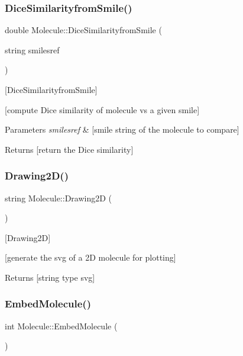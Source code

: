 \subsubsection{\texorpdfstring{Dice\+Similarityfrom\+Smile()}{DiceSimilarityfromSmile()}}
{\footnotesize\ttfamily double Molecule\+::\+Dice\+Similarityfrom\+Smile (\begin{DoxyParamCaption}\item[{string}]{smilesref }\end{DoxyParamCaption})}



\mbox{[}Dice\+Similarityfrom\+Smile\mbox{]} 

\mbox{[}compute Dice similarity of molecule vs a given smile\mbox{]}


\begin{DoxyParams}{Parameters}
{\em smilesref} & \mbox{[}smile string of the molecule to compare\mbox{]} \\
\hline
\end{DoxyParams}
\begin{DoxyReturn}{Returns}
\mbox{[}return the Dice similarity\mbox{]} 
\end{DoxyReturn}
\mbox{\label{class_molecule_a7048877e6bd7ac8c34f760ce9e92dc31}} 
\subsubsection{\texorpdfstring{Drawing2\+D()}{Drawing2D()}}
{\footnotesize\ttfamily string Molecule\+::\+Drawing2D (\begin{DoxyParamCaption}{ }\end{DoxyParamCaption})}



\mbox{[}Drawing2D\mbox{]} 

\mbox{[}generate the svg of a 2D molecule for plotting\mbox{]}

\begin{DoxyReturn}{Returns}
\mbox{[}string type svg\mbox{]} 
\end{DoxyReturn}
\mbox{\label{class_molecule_ab5b0afe25fe921c55a3a9ccd3de78b08}} 
\subsubsection{\texorpdfstring{Embed\+Molecule()}{EmbedMolecule()}\hspace{0.1cm}{\footnotesize\ttfamily [1/2]}}
{\footnotesize\ttfamily int Molecule\+::\+Embed\+Molecule (\begin{DoxyParamCaption}{ }\end{DoxyParamCaption})}



